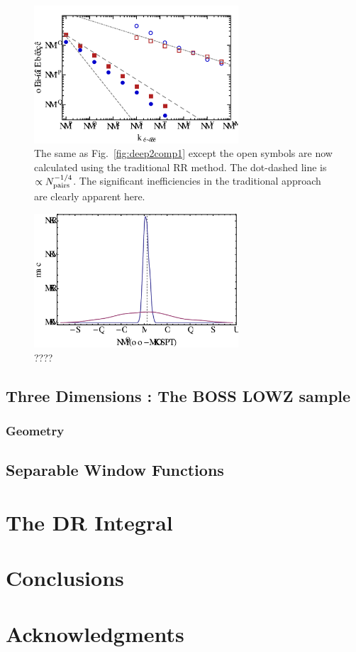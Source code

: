 \documentclass[usenatbib]{mn2e}
\begin{document}
\begin{figure}
\includegraphics[width=3in]{plots/deep2rrcomp2}
\caption{The same as Fig.~\ref{fig:deep2comp1} except the open symbols are now
calculated using the traditional RR method. The dot-dashed line is $\propto
N_{\rm pairs}^{-1/4}$. The significant inefficiencies in the traditional
approach are clearly apparent here. }
\label{fig:deep2comp2}
\end{figure}

\begin{figure}
\includegraphics[width=3in]{plots/deep2rrhist}
\caption{????}
\label{fig:deep2comp2}
\end{figure}


\lipsum[1-3]

\subsection{Three Dimensions : The BOSS LOWZ sample}

\lipsum[1-3]

\subsubsection{Geometry}

\lipsum[1-3]

\subsection{Separable Window Functions}
\label{sec:sep}

\lipsum[1-3]

\section{The DR Integral}
\label{sec:DR}

\lipsum[1-3]

\section{Conclusions}
\label{sec:conclude}

\lipsum[1-3]

\section{Acknowledgments}
\end{document}
